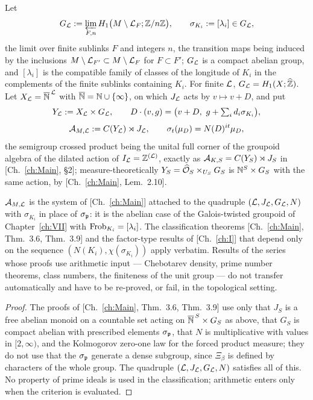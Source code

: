 \begin{definition}\label{VIII:def:system}
Let
\[
G_{\mathcal{L}}:=\varprojlim_{F,n}H_1\bigl(M\setminus\mathcal{L}_F;\mathbb{Z}/n\mathbb{Z}\bigr),
\qquad
\sigma_{K_i}:=[\lambda_i]\in G_{\mathcal{L}},
\]
the limit over finite sublinks $F$ and integers $n$, the transition maps being induced by the
inclusions $M\setminus\mathcal{L}_{F'}\subset M\setminus\mathcal{L}_F$ for $F\subset F'$; $G_{\mathcal{L}}$ is a compact
abelian group, and $[\lambda_i]$ is the compatible family of classes of the longitude of $K_i$
in the complements of the finite sublinks containing $K_i$. For finite $\mathcal{L}$, $G_{\mathcal{L}}=H_1(X;\widehat{\mathbb{Z}})$.
Let $X_{\mathcal{L}}=\overline{\mathbb{N}}^{\,\mathcal{L}}$ with $\overline{\mathbb{N}}=\mathbb{N}\cup\{\infty\}$, on which $J_{\mathcal{L}}$ acts
by $v\mapsto v+D$, and put
\[
Y_\cL:=X_\cL\times G_\cL,\qquad D\cdot(v,g)=\bigl(v+D,\ g+\textstyle\sum_id_i\sigma_{K_i}\bigr),
\]
\[
\mathcal{A}_{M,\mathcal{L}}:=C(Y_{\mathcal{L}})\rtimes J_{\mathcal{L}},\qquad \sigma_t(\mu_D)=N(D)^{it}\mu_D ,
\]
the semigroup crossed product being the unital full corner of the groupoid algebra of the
dilated action of $I_{\mathcal{L}}=\mathbb{Z}^{(\mathcal{L})}$, exactly as $\mathcal{A}_{K,S}=C(Y_S)\rtimes J_S$ in
[Ch.~\ref{ch:Main}, \S2]; measure-theoretically $Y_S=\widehat{\mathcal{O}}_S\times_{U_S}G_S$ is $\mathbb{N}^S\times G_S$
with the same action, by [Ch.~\ref{ch:Main}, Lem.~2.10].
\end{definition}

\begin{proposition}\label{VIII:prop:paperVII}
$\mathcal{A}_{M,\mathcal{L}}$ is the system of [Ch.~\ref{ch:Main}] attached to the quadruple
$(\mathcal{L},J_{\mathcal{L}},G_{\mathcal{L}},N)$ with $\sigma_{K_i}$ in place of $\sigma_{\mathfrak{p}}$: it is the abelian case of
the Galois-twisted groupoid of Chapter~\ref{ch:VII} with $\operatorname{Frob}_{K_i}=[\lambda_i]$. The
classification theorems [Ch.~\ref{ch:Main}, Thm.~3.6, Thm.~3.9] and the factor-type results of
[Ch.~\ref{ch:I}] that depend only on the sequence $(N(K_i),\chi(\sigma_{K_i}))$ apply verbatim.
Results of the series whose proofs use arithmetic input --- Chebotarev density, prime number
theorems, class numbers, the finiteness of the unit group --- do not transfer automatically
and have to be re-proved, or fail, in the topological setting.
\end{proposition}

\begin{proof}
The proofs of [Ch.~\ref{ch:Main}, Thm.~3.6, Thm.~3.9] use only that $J_S$ is a free abelian monoid on
a countable set acting on $\overline{\mathbb{N}}^{\,S}\times G_S$ as above, that $G_S$ is compact abelian
with prescribed elements $\sigma_{\mathfrak{p}}$, that $N$ is multiplicative with values in $[2,\infty)$,
and the Kolmogorov zero-one law for the forced product measure; they do not use that the
$\sigma_{\mathfrak{p}}$ generate a dense subgroup, since $\Xi_\beta$ is defined by characters of the whole
group. The quadruple $(\mathcal{L},J_{\mathcal{L}},G_{\mathcal{L}},N)$ satisfies all of this. No property of prime ideals
is used in the classification; arithmetic enters only when the criterion is evaluated.
\end{proof}

